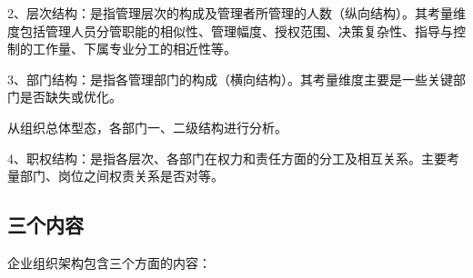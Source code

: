     2、层次结构：是指管理层次的构成及管理者所管理的人数（纵向结构）。其考量维度包括管理人员分管职能的相似性、管理幅度、授权范围、决策复杂性、指导与控制的工作量、下属专业分工的相近性等。

    3、部门结构：是指各管理部门的构成（横向结构）。其考量维度主要是一些关键部门是否缺失或优化。

    从组织总体型态，各部门一、二级结构进行分析。

    4、职权结构：是指各层次、各部门在权力和责任方面的分工及相互关系。主要考量部门、岗位之间权责关系是否对等。

\subsection {三个内容}

    企业组织架构包含三个方面的内容：

